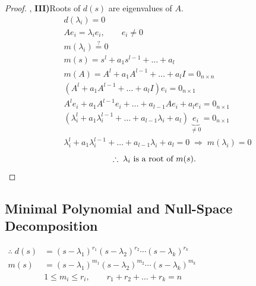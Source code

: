 \begin{proof}
\sep
\textbf{III)}\quad Roots of $d(s)$ are eigenvalues of $A$.
\begin{align*}
&d(\lambda_i)=0\\
&Ae_i=\lambda_ie_i, \qquad e_i\neq 0\\
&m(\lambda_i)\stackrel{?}{=}0\\
&m(s)=s^l+a_1s^{l-1}+\dots+a_l\\
&m(A)=A^l+a_1A^{l-1}+\dots+a_lI=0_{n\times n}\\
&(A^l+a_1A^{l-1}+\dots+a_lI)e_i=0_{n\times 1}\\
&A^le_i+a_1A^{l-1}e_i+\dots+a_{l-1}Ae_i+a_le_i=0_{n\times1}\\
&(\lambda_i^l+a_1\lambda_i^{l-1}+\dots+a_{l-1}\lambda_i+a_l)\,\underbrace{e_i}_{\neq0}=0_{n\times1}\\
&\lambda_i^l+a_1\lambda_i^{l-1}+\dots+a_{l-1}\lambda_i+a_l=0 \;\Rightarrow\; m(\lambda_i)=0
\end{align*}
\[ \therefore\;\lambda_i \text{ is a root of } m(s). \qedhere \]
\end{proof}

\subsection{Minimal Polynomial and Null-Space Decomposition}\label{ss:minpoly-decomp}
\begin{keybox}
\noindent\hfil$\displaystyle\begin{aligned}
\therefore\; d(s)&=(s-\lambda_1)^{r_1}(s-\lambda_2)^{r_2}\cdots(s-\lambda_k)^{r_k}\\
m(s)&=(s-\lambda_1)^{m_1}(s-\lambda_2)^{m_2}\cdots(s-\lambda_k)^{m_k}\\
&1\le m_i\le r_i, \qquad r_1+r_2+\dots+r_k=n
\end{aligned}$\hfil
\end{keybox}

